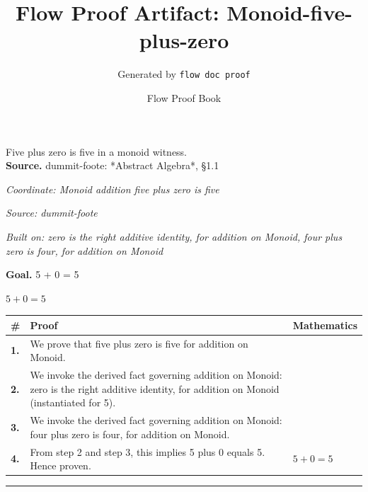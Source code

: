 \documentclass[11pt]{article}
\title{Flow Proof Artifact: Monoid-five-plus-zero}
\author{Generated by \texttt{flow doc proof}}
\date{Flow Proof Book}
\theoremstyle{definition}
\begin{document}
\maketitle
Five plus zero is five in a monoid witness.\\[0.5em]
\textbf{Source.} dummit-foote: *Abstract Algebra*, §1.1\\[0.5em]
\bigskip
{}\par
\smallskip\noindent\textit{Coordinate: Monoid \cdot addition \cdot five plus zero is five}\par
\smallskip\noindent\textit{Source: dummit-foote}\par
\smallskip\noindent\textit{Built on: zero is the right additive identity, for addition on Monoid, four plus zero is four, for addition on Monoid}\par
\medskip
\noindent\textbf{Goal.} 5 + 0 = 5\par
\noindent$\displaystyle 5 + 0 = 5$\par
\medskip
\noindent
\begin{tabular}{@{} >{\raggedright\arraybackslash}p{} >{\raggedright\arraybackslash}p{} >{\raggedleft\arraybackslash}p{} @{}}
\textbf{\#} & \textbf{Proof} & \textbf{Mathematics} \\
\midrule
\textbf{1.} & We prove that five plus zero is five for addition on Monoid. & \\[0.45em]
\textbf{2.} & We invoke the derived fact governing addition on Monoid: zero is the right additive identity, for addition on Monoid (instantiated for 5). & \\[0.45em]
\textbf{3.} & We invoke the derived fact governing addition on Monoid: four plus zero is four, for addition on Monoid. & \\[0.45em]
\textbf{4.} & From step 2 and step 3, this implies 5 plus 0 equals 5. Hence proven. & $\displaystyle 5 + 0 = 5$ \\[0.45em]
\bottomrule
\end{tabular}
\label{thm:Monoid-addition-five_plus_zero_is_five}
\par\medskip\hrule
\end{document}
